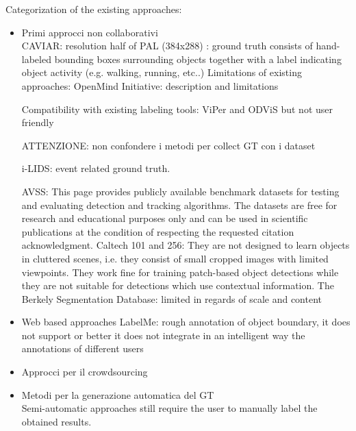 Categorization of the existing approaches: 
\begin{itemize}
\item Primi approcci non collaborativi \\
CAVIAR: resolution half of PAL  (384x288) : ground truth consists of hand-labeled bounding boxes surrounding objects together with a label indicating object activity (e.g. walking, running, etc..)
Limitations of existing approaches:
OpenMind Initiative: description and limitations

Compatibility with existing labeling tools: ViPer and ODViS but not user friendly 

ATTENZIONE: non confondere i metodi per collect GT con i dataset

 
 i-LIDS: event related ground truth.
 
 
AVSS:  This page provides publicly available benchmark datasets for testing and evaluating detection and tracking algorithms. The datasets are free for research and educational purposes only and can be used in scientific publications at the condition of respecting the requested citation acknowledgment.
Caltech 101 and 256: They are not designed to learn objects in cluttered scenes, i.e. they consist of small cropped images with limited viewpoints. They work fine for training patch-based object detections while they are not suitable for detections which use contextual information.
The Berkely Segmentation Database: limited in regards of scale and content

\item Web based approaches
LabelMe: rough annotation of object boundary, it does not support or better it does not integrate in an intelligent way the annotations of different users

\item Approcci per il crowdsourcing

\item Metodi per la generazione automatica del GT \\
Semi-automatic approaches still require the user to manually label the obtained results.

\end{itemize}




